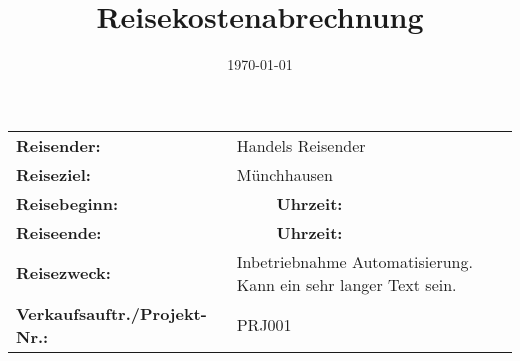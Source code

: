 \documentclass[a4paper,10pt]{scrartcl}
\title{Reisekostenabrechnung}
\author{\TravName}
\date{\today}
\def \TravName      { Handels Reisender } %
\def \TravTarget    { Münchhausen }       %
\def \TravStartedOn { \formatdate{01}{01}{2014} } %
\def \TravStartedAt { \formattime{08}{45}{00} }   %
\def \TravEndedOn   { \formatdate{05}{01}{2014} } %
\def \TravEndedAt   { \formattime{18}{15}{00} }   %
\def \TravReason    { Inbetriebnahme Automatisierung. Kann ein sehr langer Text sein. }
\def \TravProjNr    { PRJ001 }
\begin{document}
\begin{table}
	\begin{tabularx}{\textwidth}{lXlX}
	\textbf{Reisender:}                  & \multicolumn{3}{l}{ \TravName }                     \\
	\textbf{Reiseziel:}                  & \multicolumn{3}{l}{ \TravTarget }                   \\
	\textbf{Reisebeginn:}                & \TravStartedOn & \textbf{Uhrzeit:} & \TravStartedAt \\
	\textbf{Reiseende:}                  & \TravEndedOn   & \textbf{Uhrzeit:} & \TravEndedAt   \\
        \textbf{Reisezweck:}                 & \multicolumn{3}{l}{ \TravReason }                   \\
	\textbf{Verkaufsauftr./Projekt-Nr.:} & \multicolumn{3}{l}{ \TravProjNr }
	\end{tabularx}
\end{table}
\end{document}

